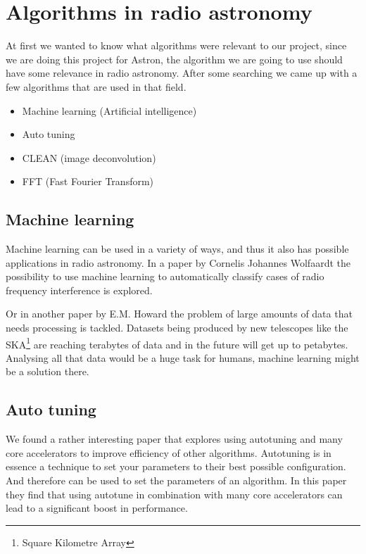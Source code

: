 \documentclass[11pt, A4, oneside]{article}
\begin{document}
\tableofcontents

\newpage

\section{Algorithms in radio astronomy}

At first we wanted to know what algorithms were relevant to our project, since we are doing this project for Astron\cite{astron}, the algorithm we are going to use should have some relevance in radio astronomy. After some searching we came up with a few algorithms that are used in that field.
\begin{itemize}
	\item Machine learning (Artificial intelligence)
	\item Auto tuning
	\item CLEAN (image deconvolution)
	\item FFT (Fast Fourier Transform)
\end{itemize}

\subsection{Machine learning}

Machine learning can be used in a variety of ways, and thus it also has possible applications in radio astronomy. In a paper by Cornelis Johannes Wolfaardt\cite{Machine_learning} the possibility to use machine learning to automatically classify cases of radio frequency interference is explored. \par 
Or in another paper by E.M. Howard\cite{Data_analysing} the problem of large amounts of data that needs processing is tackled. Datasets being produced by new telescopes like the SKA\footnote{Square Kilometre Array} are reaching terabytes of data and in the future will get up to petabytes. Analysing all that data would be a huge task for humans, machine learning might be a solution there. 

\subsection{Auto tuning}

We found a rather interesting paper that explores using autotuning and many core accelerators to improve efficiency of other algorithms\cite{Autotune}. Autotuning is in essence a technique to set your parameters to their best possible configuration. And therefore can be used to set the parameters of an algorithm. In this paper they find that using autotune in combination with many core accelerators can lead to a significant boost in performance.
\end{document}
